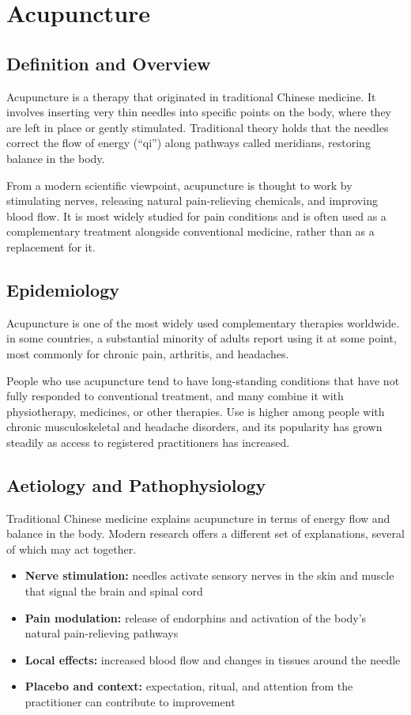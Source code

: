 \chapter{Acupuncture}

\section*{Definition and Overview}
Acupuncture is a therapy that originated in traditional Chinese medicine. It involves inserting very thin needles into specific points on the body, where they are left in place or gently stimulated. Traditional theory holds that the needles correct the flow of energy (``qi'') along pathways called meridians, restoring balance in the body.

From a modern scientific viewpoint, acupuncture is thought to work by stimulating nerves, releasing natural pain-relieving chemicals, and improving blood flow. It is most widely studied for pain conditions and is often used as a complementary treatment alongside conventional medicine, rather than as a replacement for it.

\section*{Epidemiology}
Acupuncture is one of the most widely used complementary therapies worldwide. in some countries, a substantial minority of adults report using it at some point, most commonly for chronic pain, arthritis, and headaches.

People who use acupuncture tend to have long-standing conditions that have not fully responded to conventional treatment, and many combine it with physiotherapy, medicines, or other therapies. Use is higher among people with chronic musculoskeletal and headache disorders, and its popularity has grown steadily as access to registered practitioners has increased.

\section*{Aetiology and Pathophysiology}
Traditional Chinese medicine explains acupuncture in terms of energy flow and balance in the body. Modern research offers a different set of explanations, several of which may act together.

\begin{itemize}
    \item \textbf{Nerve stimulation:} needles activate sensory nerves in the skin and muscle that signal the brain and spinal cord
    \item \textbf{Pain modulation:} release of endorphins and activation of the body's natural pain-relieving pathways
    \item \textbf{Local effects:} increased blood flow and changes in tissues around the needle
    \item \textbf{Placebo and context:} expectation, ritual, and attention from the practitioner can contribute to improvement
\end{itemize}

